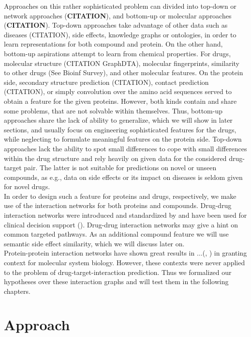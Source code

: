 \documentclass{bioinfo}
\begin{document}
Approaches on this rather sophisticated problem can divided into top-down or network approaches (\textbf{CITATION}), and bottom-up or molecular approaches (\textbf{CITATION}). Top-down approaches take advantage of other data such as diseases (CITATION), side effects, knowledge graphs or ontologies, in order to learn representations for both compound and protein. On the other hand, bottom-up aspirations attempt to learn from chemical properties. For drugs, molecular structure (CITATION GraphDTA), molecular fingerprints, similarity to other drugs (See Bioinf Survey), and other molecular features. On the protein side, secondary structure prediction (CITATION), contact prediction (CITATION), or simply convolution over the amino acid sequences served to obtain a feature for the given proteins. However, both kinds contain and share some problems, that are not solvable within themselves. Thus, bottom-up approaches share the lack of ability to generalize, which we will show in later sections, and usually focus on engineering sophisticated features for the drugs, while neglecting to formulate meaningful features on the protein side. Top-down approaches lack the ability to spot small differences to cope with small differences within the drug structure and rely heavily on given data for the considered drug-target pair. The latter is not suitable for predictions on novel or unseen compounds, as e.g., data on side effects or its impact on diseases is seldom given for novel drugs.\\ 
In order to design such a feature for proteins and drugs, respectively, we make use of the interaction networks for both proteins and compounds. Drug-drug interaction networks were introduced and standardized by \cite{Boyce2015} and have been used for clinical decision support (\cite{Scheife2015}). Drug-drug interaction networks may give a hint on common targeted pathways. As an additional compound feature we will use semantic side effect similarity, which we will discuss later on.\\
Protein-protein interaction networks have shown great results in $\dots$(\cite{Vazquez2003}, \cite{Ackerman2019}) in granting context for molecular system biology. However, these contexts were never applied to the problem of drug-target-interaction prediction. Thus we formalized our hypotheses over these interaction graphs and will test them in the following chapters.


\section{Approach}
\end{document}
